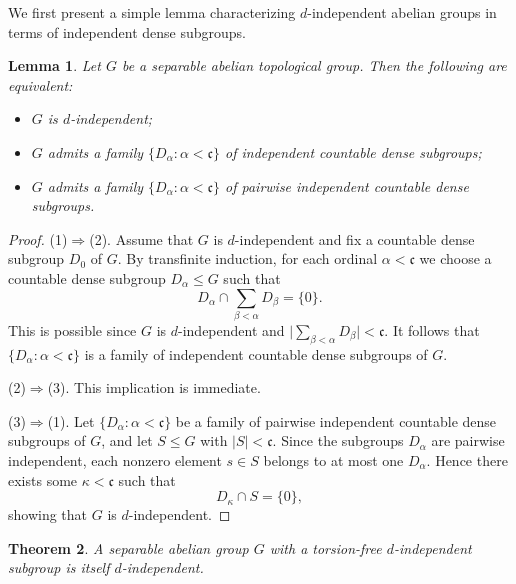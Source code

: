\documentclass[12pt]{amsart}
\newtheorem{theorem}{Theorem}[section]
\newtheorem{lemma}[theorem]{Lemma}
\theoremstyle{definition}
\theoremstyle{remark}
\begin{document}
We first present a simple lemma characterizing $d$-independent abelian groups in terms of independent dense subgroups.

\begin{lemma}\label{Le:eq}
Let $G$ be a separable abelian topological group. Then the following are equivalent:
\begin{itemize}
\item[(1)] $G$ is $d$-independent;
\item[(2)] $G$ admits a family $\{D_\alpha:\alpha<\mathfrak c\}$ of independent countable dense subgroups;
\item[(3)] $G$ admits a family $\{D_\alpha:\alpha<\mathfrak c\}$ of pairwise independent countable dense subgroups.
\end{itemize}
\end{lemma}

\begin{proof}
(1)$\Rightarrow$(2).
Assume that $G$ is $d$-independent and fix a countable dense subgroup $D_0$ of $G$.
By transfinite induction, for each ordinal $\alpha<\mathfrak c$ we choose a countable dense subgroup $D_\alpha\leq G$ such that
\[
D_\alpha\cap \sum_{\beta<\alpha} D_\beta=\{0\}.
\]
This is possible since $G$ is $d$-independent and
\(
\bigl|\sum_{\beta<\alpha} D_\beta\bigr|<\mathfrak c.
\)
It follows that $\{D_\alpha:\alpha<\mathfrak c\}$ is a family of independent countable dense subgroups of $G$.

\medskip
(2)$\Rightarrow$(3).
This implication is immediate.

\medskip
(3)$\Rightarrow$(1).
Let $\{D_\alpha:\alpha<\mathfrak c\}$ be a family of pairwise independent countable dense subgroups of $G$, and let $S\leq G$ with $|S|<\mathfrak c$.
Since the subgroups $D_\alpha$ are pairwise independent, each nonzero element $s\in S$ belongs to at most one $D_\alpha$.
Hence there exists some $\kappa<\mathfrak c$ such that
\[
D_\kappa\cap S=\{0\},
\]
showing that $G$ is $d$-independent.
\end{proof}






\begin{theorem}\label{Th:eq}
A separable abelian group $G$ with a torsion-free $d$-independent subgroup
is itself $d$-independent.
\end{theorem}
\end{document}

